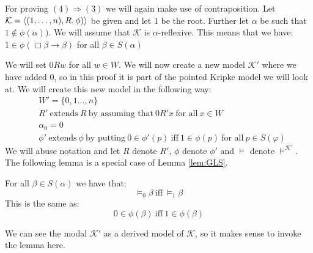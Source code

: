 \documentclass[../main.tex]{subfiles}
\begin{document}
For proving $(4)\Rightarrow(3)$ we will again make use of contraposition. Let
$\mathcal{K}=\langle(1,\ldots,n),R,\phi)\rangle$ be given and let $1$ be the root.
Further let $\alpha$ be such that $1\not\in\phi(\alpha))$.
We
will assume that $\mathcal{K}$ is $\alpha$-reflexive. This means that we have:
$1\in\phi(\Box\beta\rightarrow\beta)$ for all $\beta\in S(\alpha)$

We will set $0Rw$ for all $w\in W$. We will now create a new model
$\mathcal{K'}$ where we have added $0$, so in this proof it is part of the
pointed Kripke model we will look at. We will create this new model in the
following way:
\begin{align*}
	&W'=\{0,1\ldots,n\}\\
	&R'\ \text{extends}\ R\ \text{by assuming that}\ 0R'x\ \text{for all}\
	x\in W\\
	&\alpha_0=0\\
	&\phi'\ \text{extends}\ \phi\ \text{by putting}\ 0\in\phi'(p)\
	\text{iff}\ 1\in\phi(p)\ \text{for all}\ p\in S(\varphi)
\end{align*}
We will abuse notation and let $R$ denote $R'$, $\phi$ denote $\phi'$ and
$\vDash$ denote $\vDash^{\mathcal{K'}}$.
The following lemma is a special case of Lemma \ref{lem:GLS}.
\begin{lem}
	For all $\beta\in S(\alpha)$ we have that:
	\[\vDash_0\beta\ \text{iff}\ \vDash_1\beta \]
	This is the same as:
	\[0\in\phi(\beta)\ \text{iff}\ 1\in\phi(\beta)\]
\end{lem}
We can see the modal $\mathcal{K}'$ as a derived model of $\mathcal{K}$, so it
makes sense to invoke the lemma here.
\end{document}
